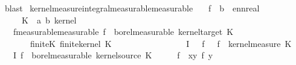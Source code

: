 \begin{isabellebody}
\ blast\isanewline
{}\isamarkupfalse%
%
\endisatagproof
{\isafoldproof}%
%
\isadelimproof
%
\endisadelimproof
\isanewline
\isanewline
{}\isamarkupfalse%
\ kernel{\isacharunderscore}{\kern0pt}measure{\isacharunderscore}{\kern0pt}integral{\isacharunderscore}{\kern0pt}measurable{\isacharbrackleft}{\kern0pt}measurable{\isacharbrackright}{\kern0pt}{\isacharcolon}{\kern0pt}\isanewline
\ \ \ f\ {\isacharcolon}{\kern0pt}{\isacharcolon}{\kern0pt}\ {\isachardoublequoteopen}{\isacharprime}{\kern0pt}b\ {\isasymRightarrow}\ ennreal{\isachardoublequoteclose}\isanewline
\ \ \ \ \ K\ {\isacharcolon}{\kern0pt}{\isacharcolon}{\kern0pt}\ {\isachardoublequoteopen}{\isacharparenleft}{\kern0pt}{\isacharprime}{\kern0pt}a{\isacharcomma}{\kern0pt}\ {\isacharprime}{\kern0pt}b{\isacharparenright}{\kern0pt}\ kernel{\isachardoublequoteclose}\isanewline
\ \ \ f{\isacharunderscore}{\kern0pt}measurable{\isacharbrackleft}{\kern0pt}measurable{\isacharbrackright}{\kern0pt}{\isacharcolon}{\kern0pt}\ {\isachardoublequoteopen}f\ {\isasymin}\ borel{\isacharunderscore}{\kern0pt}measurable\ {\isacharparenleft}{\kern0pt}kernel{\isacharunderscore}{\kern0pt}target\ K{\isacharparenright}{\kern0pt}{\isachardoublequoteclose}\isanewline
\ \ \ \ \ \ \ finite{\isacharunderscore}{\kern0pt}K{\isacharcolon}{\kern0pt}\ {\isachardoublequoteopen}finite{\isacharunderscore}{\kern0pt}kernel\ K{\isachardoublequoteclose}\ \ \ \ \ \ \ \ \ \ \ \ \ \ \isanewline
\ \ \ {\isachardoublequoteopen}I\ {\isasymequiv}\ {\isasymlambda}\ f{\isachardot}{\kern0pt}\ {\isacharparenleft}{\kern0pt}{\isasymlambda}{\isasymomega}\ {\isasymintegral}\isactrlsup {\isacharplus}{\kern0pt}{\isasymomega}\ f\ {\isasymomega}\ {\isasympartial}kernel{\isacharunderscore}{\kern0pt}measure\ K\ {\isasymomega}\isanewline
\ \ \ {\isachardoublequoteopen}I\ f\ {\isasymin}\ borel{\isacharunderscore}{\kern0pt}measurable\ {\isacharparenleft}{\kern0pt}kernel{\isacharunderscore}{\kern0pt}source\ K{\isacharparenright}{\kern0pt}{\isachardoublequoteclose}\isanewline
%
\isadelimproof
%
\endisadelimproof
%
\isatagproof
{}\isamarkupfalse%
\ {\isacharminus}{\kern0pt}\isanewline
\ \ \isamarkupfalse%
\ {\isacharquery}{\kern0pt}f{\isacharprime}{\kern0pt}\ {\isacharequal}{\kern0pt}\ {\isachardoublequoteopen}{\isasymlambda}{\isacharparenleft}{\kern0pt}x{\isacharcomma}{\kern0pt}y{\isacharparenright}{\kern0pt}{\isachardot}{\kern0pt}\ f\ y{\isachardoublequoteclose}\isanewline

\end{isabellebody}
